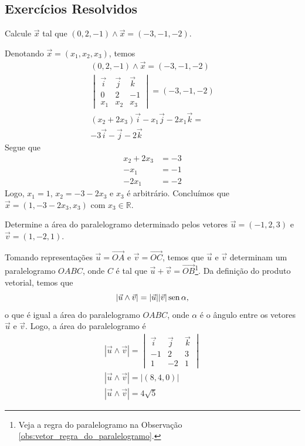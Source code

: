\subsection{Exercícios Resolvidos}

\begin{exeresol}
  Calcule $\vec{x}$ tal que $(0,2,-1)\land\vec{x}=(-3,-1,-2)$.
\end{exeresol}
\begin{resol}
  Denotando $\vec{x}=(x_1,x_2,x_3)$, temos
  \begin{gather}
    (0,2,-1)\land\vec{x}=(-3,-1,-2)\\
    \begin{vmatrix}
      \vec{i} & \vec{j} & \vec{k} \\
      0 & 2 & -1 \\
      x_1 & x_2 & x_3
    \end{vmatrix} = (-3,-1,-2)\\
    (x_2+2x_3)\vec{i}-x_1\vec{j}-2x_1\vec{k} = \\
    -3\vec{i}-\vec{j}-2\vec{k}
  \end{gather}
  Segue que
  \begin{align*}
    x_2+2x_3 &= -3\\
    -x_1 &= -1\\
    -2x_1 &= -2
  \end{align*}
  Logo, $x_1 = 1$, $x_2=-3-2x_3$ e $x_3$ é arbitrário. Concluímos que $\vec{x} = (1,-3-2x_3,x_3)$ com $x_3\in\mathbb{R}$.
\end{resol}

\begin{exeresol}
  Determine a área do paralelogramo determinado pelos vetores $\vec{u} = (-1, 2, 3)$ e $\vec{v} = (1,-2,1)$.
\end{exeresol}
\begin{resol}
  Tomando representações $\vec{u}=\overrightarrow{OA}$ e $\vec{v}=\overrightarrow{OC}$, temos que $\vec{u}$ e $\vec{v}$ determinam um paralelogramo $OABC$, onde $C$ é tal que $\vec{u}+\vec{v}=\overrightarrow{OB}$\footnote{Veja a regra do paralelogramo na Observação \ref{obs:vetor_regra_do_paralelogramo}.}. Da definição do produto vetorial, temos que
  \begin{equation}
    |\vec{u}\land\vec{v}| = |\vec{u}||\vec{v}|\operatorname{sen}\alpha,
  \end{equation}
  o que é igual a área do paralelogramo $OABC$, onde $\alpha$ é o ângulo entre os vetores $\vec{u}$ e $\vec{v}$. Logo, a área do paralelogramo é
  \begin{gather}
    |\vec{u}\land\vec{v}| =
    \begin{vmatrix}
      \vec{i} & \vec{j} & \vec{k} \\
      -1 & 2 & 3 \\
      1 & -2 & 1
    \end{vmatrix}\\
    |\vec{u}\land\vec{v}| = |(8,4,0)|\\
    |\vec{u}\land\vec{v}| = 4\sqrt{5}
  \end{gather}
\end{resol}

